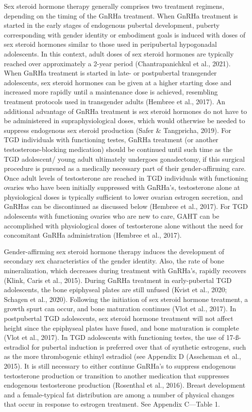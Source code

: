\documentclass[
]{book}
\begin{document}
Sex steroid hormone therapy generally comprises two treatment regimens, depending on the
timing of the GnRHa treatment. When GnRHa
treatment is started in the early stages of endogenous pubertal development, puberty corresponding with gender identity or embodiment goals is
induced with doses of sex steroid hormones similar to those used in peripubertal hypogonadal
adolescents. In this context, adult doses of sex
steroid hormones are typically reached over
approximately a 2-year period (Chantrapanichkul
et al., 2021). When GnRHa treatment is started
in late- or postpubertal transgender adolescents,
sex steroid hormones can be given at a higher
starting dose and increased more rapidly until a
maintenance dose is achieved, resembling treatment protocols used in transgender adults
(Hembree et al., 2017). An additional advantage
of GnRHa treatment is sex steroid hormones do
not have to be administered in supraphysiological
doses, which would otherwise be needed to suppress endogenous sex steroid production (Safer
\& Tangpricha, 2019). For TGD individuals with
functioning testes, GnRHa treatment (or another
testosterone-blocking medication) should be continued until such time as the TGD adolescent/
young adult ultimately undergoes gonadectomy,
if this surgical procedure is pursued as a medically necessary part of their gender-affirming
care. Once adult levels of testosterone are reached
in TGD individuals with functioning ovaries who
have been initially suppressed with GnRHa's, testosterone alone at physiological doses is typically
sufficient to lower ovarian estrogen secretion, and
GnRHas can be discontinued as discussed below
(Hembree et al., 2017). For TGD adolescents with
functioning ovaries who are new to care, GAHT
can be accomplished with physiological doses of
testosterone alone without the need for concomitant GnRHa administration (Hembree et al., 2017).

Gender-affirming sex steroid hormone therapy
induces the development of secondary sex characteristics of the gender identity. Also, the rate
of bone mineralization, which decreases during
treatment with GnRHa's, rapidly recovers (Klink,
Caris et al., 2015). During GnRHa treatment in
early-pubertal TGD adolescents, the bone epiphyseal plates are still unfused (Kvist et al., 2020;
Schagen et al., 2020). Following the initiation of
sex steroid hormone treatment, a growth spurt
can occur, and bone maturation continues (Vlot
et al., 2017). In postpubertal TGD adolescents,
sex steroid hormone treatment will not affect
height since the epiphyseal plates have fused, and
bone maturation is complete (Vlot et al., 2017).
In TGD adolescents with functioning testes,
the use of 17-ß-estradiol for pubertal induction
is preferred over that of synthetic estrogens, such
as the more thrombogenic ethinyl estradiol (see
Appendix D (Asscheman et al., 2015). It is still
necessary to either continue GnRHa's to suppress
endogenous testosterone production or transition
to another medication that suppresses endogenous testosterone production (Rosenthal et al.,
2016). Breast development and a female-typical
fat distribution are among a number of physical
changes that occur in response to estrogen treatment. See Appendix C---Table 1.
\end{document}
